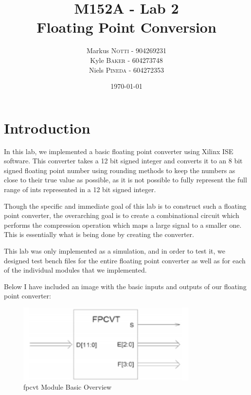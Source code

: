 \documentclass{article}
\title{M152A - Lab 2 \\ Floating Point Conversion} %
\author{Markus \textsc{Notti} - 904269231 \\ Kyle \textsc{Baker}  - 604273748 \\ Niels \textsc{Pineda} - 604272353} %
\date{\today} %
\begin{document}
\maketitle %


\section*{Introduction}

In this lab, we implemented a basic floating point converter using Xilinx ISE software.  This converter takes a 12 bit signed integer and converts it to an 8 bit signed floating point number using rounding methods to keep the numbers as close to their true value as possible, as it is not possible to fully represent the full range of ints represented in a 12 bit signed integer.

Though the specific and immediate goal of this lab is to construct such a floating point converter, the overarching goal is to create a combinational circuit which performs the compression operation which maps a large signal to a smaller one.  This is essentially what is being done by creating the converter.

This lab was only implemented as a simulation, and in order to test it, we designed test bench files for the entire floating point converter as well as for each of the individual modules that we implemented.

Below I have included an image with the basic inputs and outputs of our floating point converter:

\begin{figure}[H]
\begin{center}
\includegraphics[width=0.8\textwidth]{fpcvtModulePic.png} 
\caption{fpcvt Module Basic Overview}
\end{center}
\end{figure}
\end{document}
